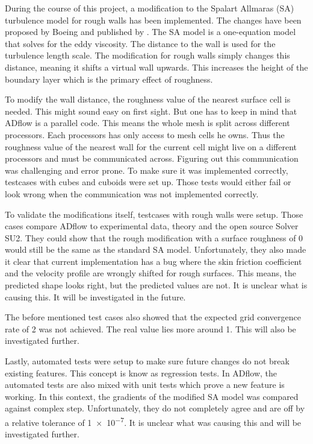 During the course of this project, a modification to the Spalart Allmaras (SA)
turbulence model for rough walls has been implemented. The changes have been
proposed by Boeing and published by \cite{sa_rough}. The SA model is a
one-equation model that solves for the eddy viscosity. The distance to the wall
is used for the turbulence length scale. The modification for rough walls simply
changes this distance, meaning it shifts a virtual wall upwards. This increases
the height of the boundary layer which is the primary effect of roughness.

To modify the wall distance, the roughness value of the nearest surface cell is
needed. This might sound easy on first sight. But one has to keep in mind that
ADflow is a parallel code. This means the whole mesh is split across different
processors. Each processors has only access to mesh cells he owns. Thus the
roughness value of the nearest wall for the current cell might live on a
different processors and must be communicated across. Figuring out this
communication was challenging and error prone. To make sure it was implemented
correctly, testcases with cubes and cuboids were set up. Those tests would
either fail or look wrong when the communication was not implemented correctly.

To validate the modifications itself, testcases with rough walls were setup.
Those cases compare ADflow to experimental data, theory and the open source
Solver SU2. They could show that the rough modification with a surface roughness
of 0 would still be the same as the standard SA model. Unfortunately, they also
made it clear that current implementation has a bug where the skin friction
coefficient and the velocity profile are wrongly shifted for rough surfaces.
This means, the predicted shape looks right, but the predicted values are not.
It is unclear what is causing this. It will be investigated in the future.

The before mentioned test cases also showed that the expected grid convergence
rate of 2 was not achieved. The real value lies more around 1. This will also be
investigated further.

Lastly, automated tests were setup to make sure future changes do not break
existing features. This concept is know as regression tests. In ADflow, the
automated tests are also mixed with unit tests which prove a new feature is
working. In this context, the gradients of the modified SA model was compared
against complex step. Unfortunately, they do not completely agree and are off by
a relative tolerance of \num{1e-7}. It is unclear what was causing this and will
be investigated further.

